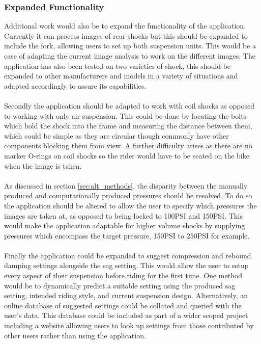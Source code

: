 		\subsubsection{Expanded Functionality}
			Additional work would also be to expand the functionality of the application. Currently it can process images of rear shocks but this should be expanded to include the fork, allowing users to set up both suspension units. This would be a case of adapting the current image analysis to work on the different images. The application has also been tested on two varieties of shock, this should be expanded to other manufacturers and models in a variety of situations and adapted accordingly to assure its capabilities.
			\\\\
			Secondly the application should be adapted to work with coil shocks as opposed to working with only air suspension. This could be done by locating the bolts which hold the shock into the frame and measuring the distance between them, which could be simple as they are circular though commonly have other components blocking them from view. A further difficulty arises as there are no marker O-rings on coil shocks so the rider would have to be seated on the bike when the image is taken.
			\\\\
			As discussed in section \ref{sec:alt_methods}, the disparity between the manually produced and computationally produced pressures should be resolved. To do so the application should be altered to allow the user to specify which pressures the images are taken at, as opposed to being locked to 100PSI and 150PSI. This would make the application adaptable for higher volume shocks by supplying pressures which encompass the target pressure, 150PSI to 250PSI for example.
			\\\\
			Finally the application could be expanded to suggest compression and rebound damping settings alongside the sag setting. This would allow the user to setup every aspect of their suspension before riding for the first time. One method would be to dynamically predict a suitable setting using the produced sag setting, intended riding style, and current suspension design. Alternatively, an online database of suggested settings could be collated and queried with the user's data. This database could be included as part of a wider scoped project including a website allowing users to look up settings from those contributed by other users rather than using the application.
